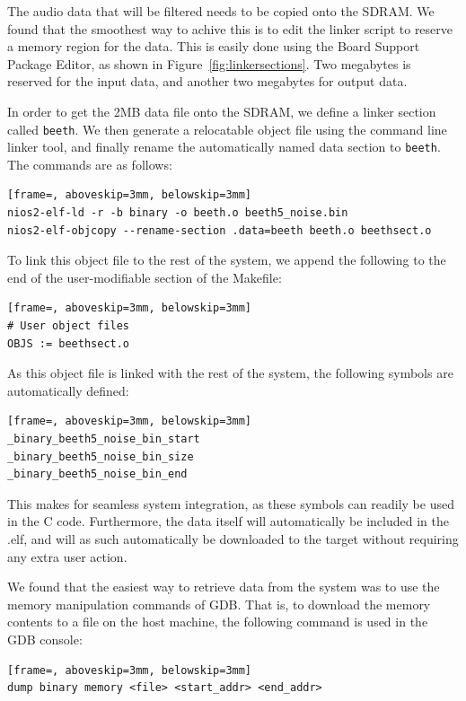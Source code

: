 \documentclass[]{article}
\begin{document}
The audio data that will be filtered needs to be copied onto the SDRAM. We found that the smoothest way to achive this is to edit the linker script to reserve a memory region for the data. This is easily done using the Board Support Package Editor, as shown in Figure~\ref{fig:linkersections}.
Two megabytes is reserved for the input data, and another two megabytes for output data.

In order to get the 2MB data file onto the SDRAM, we define a linker section called \verb"beeth". We then generate a relocatable object file using the command line linker tool, and finally rename the automatically named data section to \verb"beeth".
The commands are as follows:

\begin{lstlisting}[frame=, aboveskip=3mm, belowskip=3mm]
nios2-elf-ld -r -b binary -o beeth.o beeth5_noise.bin
nios2-elf-objcopy --rename-section .data=beeth beeth.o beethsect.o
\end{lstlisting}

To link this object file to the rest of the system, we append the following to the end of the user-modifiable section of the Makefile:

\begin{lstlisting}[frame=, aboveskip=3mm, belowskip=3mm]
# User object files
OBJS := beethsect.o
\end{lstlisting}

As this object file is linked with the rest of the system, the following symbols are automatically defined:

\begin{lstlisting}[frame=, aboveskip=3mm, belowskip=3mm]
_binary_beeth5_noise_bin_start
_binary_beeth5_noise_bin_size
_binary_beeth5_noise_bin_end
\end{lstlisting}

This makes for seamless system integration, as these symbols can readily be used in the C code. Furthermore, the data itself will automatically be included in the .elf, and will as such automatically be downloaded to the target without requiring any extra user action.

We found that the easiest way to retrieve data from the system was to use the memory manipulation commands of GDB. That is, to download the memory contents to a file on the host machine, the following command is used in the GDB console:

\begin{lstlisting}[frame=, aboveskip=3mm, belowskip=3mm]
dump binary memory <file> <start_addr> <end_addr>
\end{lstlisting}
\end{document}

